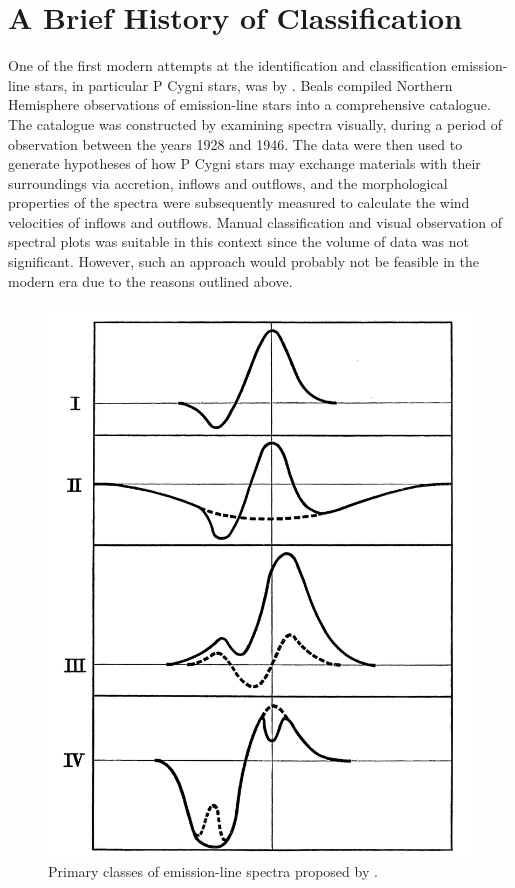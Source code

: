 \section{A Brief History of Classification}
One of the first modern attempts at the identification and classification emission-line stars, in particular P Cygni stars, was by \citet{1953PDAO....9....1B}. Beals compiled Northern Hemisphere observations of emission-line stars into a comprehensive catalogue. The catalogue was constructed by examining spectra visually, during a period of observation between the years 1928 and 1946. The data were then used to generate hypotheses of how P Cygni stars may exchange materials with their surroundings via accretion, inflows and outflows, and the morphological properties of the spectra were subsequently measured to calculate the wind velocities of inflows and outflows. Manual classification and visual observation of spectral plots was suitable in this context since the volume of data was not significant. However, such an approach would probably not be feasible in the modern era due to the reasons outlined above.

\begin{figure}[!htb]
\centering
\includegraphics[scale=.35]{figures/beals class 1.png}
\caption{Primary classes of emission-line spectra proposed by \citet{1953PDAO....9....1B}.}
\end{figure}


